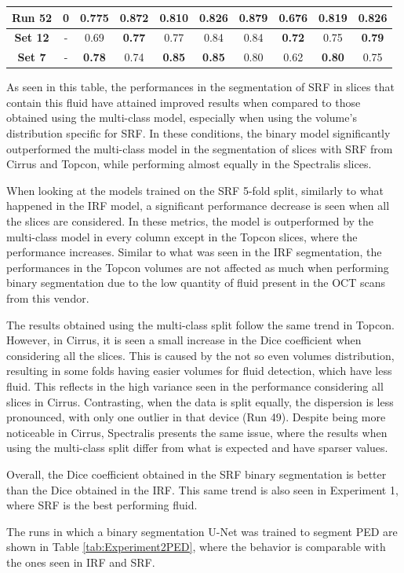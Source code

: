 \begin{table}[!ht]
\begin{tabular}{|c|c|cc|cc|cc|cc|}
		\textbf{Run 52} & 0 & 0.775 & \textbf{0.872} & 0.810 & 0.826 & 0.879 & 0.676 & 0.819 & \textbf{0.826} \\
		
		\hline
		
		\textbf{Set 12} & - & 0.69 & \textbf{0.77} & 0.77 & 0.84 & 0.84 & \textbf{0.72} & 0.75 & \textbf{0.79} \\
		
		\hline
		\hline
		
		\textbf{Set 7} & - & \textbf{0.78} & 0.74 & \textbf{0.85} & \textbf{0.85} & 0.80 & 0.62 & \textbf{0.80} & 0.75 \\
		
		\hline
		
	\end{tabular}
	\label{tab:Experiment2SRF}
\end{table}

As seen in this table, the performances in the segmentation of SRF in slices that contain this fluid have attained improved results when compared to those obtained using the multi-class model, especially when using the volume's distribution specific for SRF. In these conditions, the binary model significantly outperformed the multi-class model in the segmentation of slices with SRF from Cirrus and Topcon, while performing almost equally in the Spectralis slices.
\par
When looking at the models trained on the SRF 5-fold split, similarly to what happened in the IRF model, a significant performance decrease is seen when all the slices are considered. In these metrics, the model is outperformed by the multi-class model in every column except in the Topcon slices, where the performance increases. Similar to what was seen in the IRF segmentation, the performances in the Topcon volumes are not affected as much when performing binary segmentation due to the low quantity of fluid present in the OCT scans from this vendor.
\par
The results obtained using the multi-class split follow the same trend in Topcon. However, in Cirrus, it is seen a small increase in the Dice coefficient when considering all the slices. This is caused by the not so even volumes distribution, resulting in some folds having easier volumes for fluid detection, which have less fluid. This reflects in the high variance seen in the performance considering all slices in Cirrus. Contrasting, when the data is split equally, the dispersion is less pronounced, with only one outlier in that device (Run 49). Despite being more noticeable in Cirrus, Spectralis presents the same issue, where the results when using the multi-class split differ from what is expected and have sparser values.
\par
Overall, the Dice coefficient obtained in the SRF binary segmentation is better than the Dice obtained in the IRF. This same trend is also seen in Experiment 1, where SRF is the best performing fluid.
\par
The runs in which a binary segmentation U-Net was trained to segment PED are shown in Table \ref{tab:Experiment2PED}, where the behavior is comparable with the ones seen in IRF and SRF.

